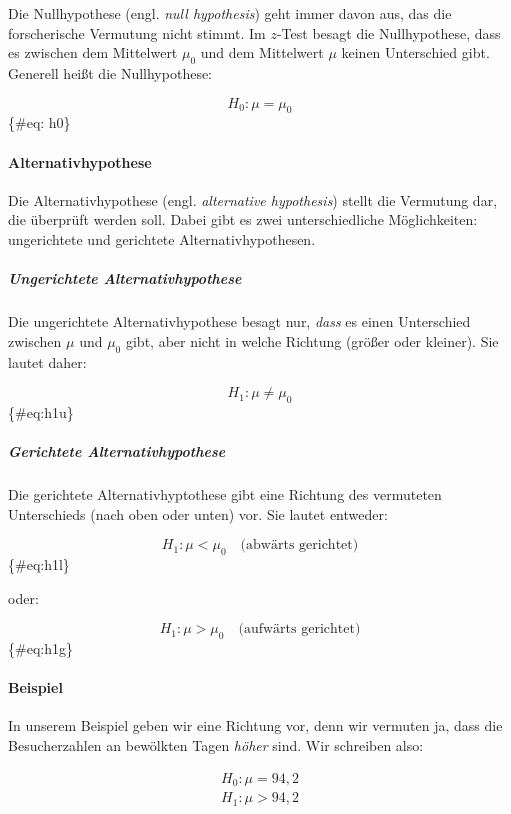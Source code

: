 \documentclass[
  ngerman,
]{article}
\begin{document}
Die Nullhypothese (engl. \emph{null hypothesis}) geht immer davon aus, das die forscherische Vermutung nicht stimmt. Im \(z\)-Test besagt die Nullhypothese, dass es zwischen dem Mittelwert \(\mu_0\) und dem Mittelwert \(\mu\) keinen Unterschied gibt. Generell heißt die Nullhypothese:

\[
H_0 : \mu = \mu_0
\]\{\#eq: h0\}

\hypertarget{alternativhypothese}{%
\paragraph{Alternativhypothese}\label{alternativhypothese}}

Die Alternativhypothese (engl. \emph{alternative hypothesis}) stellt die Vermutung dar, die überprüft werden soll. Dabei gibt es zwei unterschiedliche Möglichkeiten: ungerichtete und gerichtete Alternativhypothesen.

\hypertarget{ungerichtete-alternativhypothese}{%
\subparagraph{Ungerichtete Alternativhypothese}\label{ungerichtete-alternativhypothese}}

Die ungerichtete Alternativhypothese besagt nur, \emph{dass} es einen Unterschied zwischen \(\mu\) und \(\mu_0\) gibt, aber nicht in welche Richtung (größer oder kleiner). Sie lautet daher:

\[
H_1 : \mu \neq \mu_0
\]\{\#eq:h1u\}

\hypertarget{gerichtete-alternativhypothese}{%
\subparagraph{Gerichtete Alternativhypothese}\label{gerichtete-alternativhypothese}}

Die gerichtete Alternativhyptothese gibt eine Richtung des vermuteten Unterschieds (nach oben oder unten) vor. Sie lautet entweder:

\[
H_1 : \mu < \mu_0 \quad \textrm{(abwärts gerichtet)}
\]\{\#eq:h1l\}

oder:

\[
H_1 : \mu > \mu_0 \quad \textrm{(aufwärts gerichtet)}
\]\{\#eq:h1g\}

\hypertarget{beispiel-1}{%
\paragraph{Beispiel}\label{beispiel-1}}

In unserem Beispiel geben wir eine Richtung vor, denn wir vermuten ja, dass die Besucherzahlen an bewölkten Tagen \emph{höher} sind. Wir schreiben also:

\[\begin{aligned}
H_0: \mu = 94{,}2\\[4pt]
H_1: \mu>94{,}2
\end{aligned}\]
\end{document}
